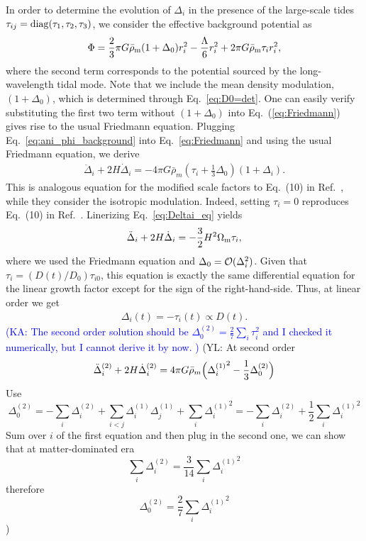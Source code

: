 \documentclass[a4paper,11pt]{article}
\newcommand{\YL}[1]{\textcolor{Bittersweet}{(YL: #1)}}
\newcommand{\KA}[1]{\textcolor{Blue}{(KA: #1)}}
\begin{document}
In order to determine the evolution of $\Delta_i$ in the presence of the large-scale tides $\tau_{ij}={\rm diag}(\tau_1,\tau_2,\tau_3)$,
we consider the effective background potential as
\begin{align}
    \Phi = \frac{2}{3}\pi G\bar{\rho}_{\rm m}(1+\Delta_0) r_i^2 - \frac{\Lambda}{6}r_i^2
            +2 \pi G\bar{\rho}_{\rm m}\tau_i r_i^2,
            \label{eq:ani_phi_background}
\end{align}
where the second term corresponds to the potential sourced by the long-wavelength tidal mode.
Note that we include the mean density modulation, $(1+\Delta_0)$,
which is determined through Eq.~\eqref{eq:D0=det}.
One can easily verify substituting the first two term without $(1+\Delta_0)$
into Eq.~(\ref{eq:Friedmann}) gives rise to the usual Friedmann equation.
Plugging Eq.~\eqref{eq:ani_phi_background} into Eq.~\eqref{eq:Friedmann}
and using the usual Friedmann equation,
we derive
\begin{align}
    \ddot \Delta_i + 2H\dot \Delta_i
    = -4\pi G \bar{\rho}_m\left(\tau_i + \frac{1}{3}\Delta_0\right) (1+\Delta_i).
    \label{eq:Deltai_eq}
\end{align}
This is analogous equation for the modified scale factors to Eq.~(10) in Ref.~\cite{Wagner_etal:2014},
while they consider the isotropic modulation.
Indeed, setting $\tau_i=0$ reproduces Eq.~(10) in Ref.~\cite{Wagner_etal:2014}.
Linerizing Eq.~\eqref{eq:Deltai_eq} yields
\begin{align}
 \ddot \Delta_i + 2H\dot \Delta_i
 = -\frac{3}{2}H^2\Omega_{\rm m}\tau_i,
\end{align}
where we used the Friedmann equation and $\Delta_0 = {\cal O}(\Delta_i^2)$.
Given that $\tau_i = (D(t)/D_0)\tau_{i0}$,
this equation is exactly the same differential equation for the linear growth factor
except for the sign of the right-hand-side.
Thus, at linear order we get
\begin{align}
\Delta_i(t) = -\tau_i(t) \propto D(t).
\end{align}
\KA{
The second order solution should be $\Delta^{(2)}_0 = \frac{2}{7}\sum_i\tau_i^2$ and I checked it numerically, but I cannot derive it by now.
}
\YL{
At second order
\begin{equation}
    \ddot\Delta_i^{(2)} + 2H \dot\Delta_i^{(2)}
    = 4\pi G \bar\rho_m \Bigl( {\Delta_i^{(1)}}^2 - \frac13 \Delta_0^{(2)} \Bigr)
\end{equation}
Use
\begin{equation}
    \Delta_0^{(2)} = - \sum_i \Delta_i^{(2)}
    + \sum_{i<j} \Delta_i^{(1)} \Delta_j^{(1)} + \sum_i {\Delta_i^{(1)}}^2
    = - \sum_i \Delta_i^{(2)} + \frac12 \sum_i {\Delta_i^{(1)}}^2
\end{equation}
Sum over $i$ of the first equation and then plug in the second one, we can show that
at matter-dominated era
\begin{equation}
    \sum_i \Delta_i^{(2)} = \frac3{14} \sum_i {\Delta_i^{(1)}}^2
\end{equation}
therefore
\begin{equation}
    \Delta_0^{(2)} = \frac27 \sum_i {\Delta_i^{(1)}}^2
\end{equation}
}
\end{document}
